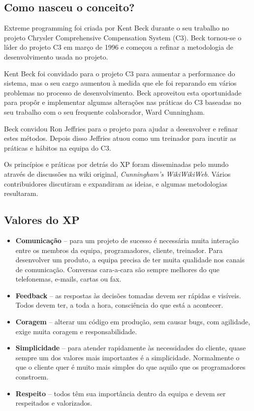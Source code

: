 \subsection{Como nasceu o conceito?}
Extreme programming foi criada por Kent Beck durante o seu trabalho no projeto Chrysler Comprehensive Compensation System (C3). Beck tornou-se o líder do projeto C3 em março de 1996 e começou a refinar a metodologia de desenvolvimento usada no projeto.

Kent Beck foi convidado para o projeto C3 para aumentar a performance do sistema, mas o seu cargo aumentou à medida que ele foi reparando em vários problemas no processo de desenvolvimento. Beck aproveitou esta oportunidade para propôr e implementar algumas alterações nas práticas do C3 baseadas no seu trabalho com o seu frequente colaborador, Ward Cunningham. 

Beck convidou Ron Jeffries para o projeto para ajudar a desenvolver e refinar estes métodos. Depois disso Jeffries atuou como um treinador para incutir as práticas e hábitos na equipa do C3.

Os princípios e práticas por detrás do XP foram disseminadas pelo mundo através de discussões na wiki original, \textit{Cunningham's WikiWikiWeb}. Vários contribuidores discutiram e expandiram as ideias, e algumas metodologias resultaram.


\subsection{Valores do XP}
\begin{itemize}
    \item \textbf{Comunicação} – para um projeto de sucesso é necessária muita interação entre os membros da equipa, programadores, cliente, treinador. Para desenvolver um produto, a equipa precisa de ter muita qualidade nos canais de comunicação. Conversas cara-a-cara são sempre melhores do que telefonemas, e-mails, cartas ou fax.
    
    \item \textbf{Feedback} – as respostas às decisões tomadas devem ser rápidas e visíveis. Todos devem ter, a toda a hora, consciência do que está a acontecer.
    
    \item \textbf{Coragem} – alterar um código em produção, sem causar bugs, com agilidade, exige muita coragem e responsabilidade.
    
    \item \textbf{Simplicidade} – para atender rapidamente às necessidades do cliente, quase sempre um dos valores mais importantes é a simplicidade. Normalmente o que o cliente quer é muito mais simples do que aquilo que os programadores constroem. 
    \item \textbf{Respeito} – todos têm sua importância dentro da equipa e devem ser respeitados e valorizados.

\end{itemize}

